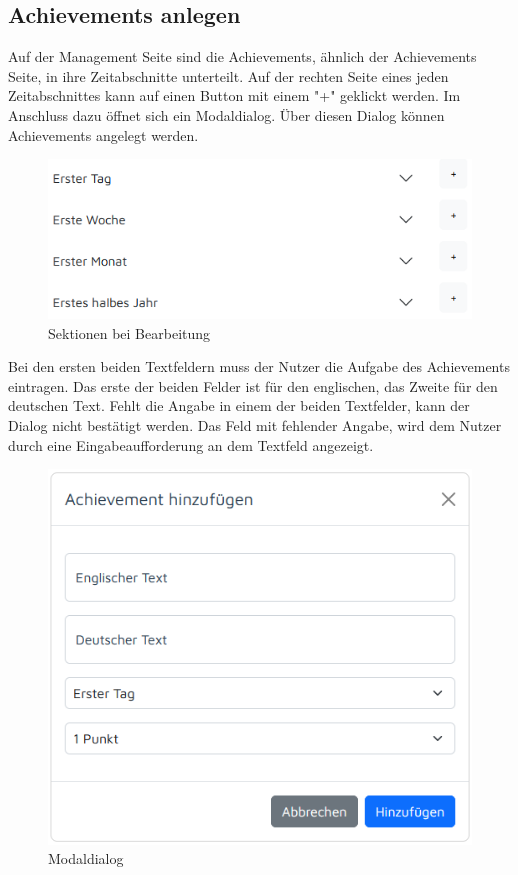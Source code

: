 \documentclass[11pt]{article}
\begin{document}
\subsection{Achievements anlegen}
Auf der Management Seite sind die Achievements, ähnlich der Achievements Seite, in ihre Zeitabschnitte unterteilt.
Auf der rechten Seite eines jeden Zeitabschnittes kann auf einen Button mit einem "+" geklickt werden.
Im Anschluss dazu öffnet sich ein Modaldialog.
Über diesen Dialog können Achievements angelegt werden.

\begin{figure}
    \centering
    \includegraphics[width=.5\textwidth]{application/sections_manage.png}
    \caption{Sektionen bei Bearbeitung}
\end{figure}
Bei den ersten beiden Textfeldern muss der Nutzer die Aufgabe des Achievements eintragen.
Das erste der beiden Felder ist für den englischen, das Zweite für den deutschen Text.
Fehlt die Angabe in einem der beiden Textfelder, kann der Dialog nicht bestätigt werden.
Das Feld mit fehlender Angabe, wird dem Nutzer durch eine Eingabeaufforderung an dem Textfeld angezeigt.
\begin{figure}[H]
    \centering
    \includegraphics{application/popup_manage.png}
    \caption{Modaldialog}
\end{figure}
\end{document}
